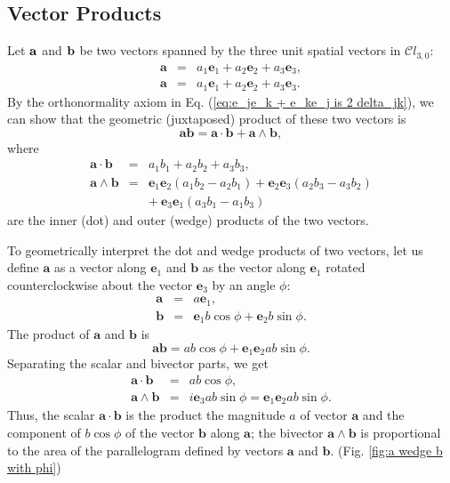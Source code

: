 \documentclass[11pt,twocolumn]{article}
\begin{document}
\subsection{Vector Products}  

Let ${\bf a}$ and ${\bf b}$ be two vectors spanned by the three unit spatial vectors in $\mathcal Cl_{3,0}$:
\begin{eqnarray}
\label{eq:a is a_1e_1 + a_2e_2 + a_3e_3}
\mathbf a&=&a_1\mathbf e_1+a_2\mathbf e_2+a_3\mathbf e_3,\\
\label{eq:b is b_1e_1 + b_2e_2 + b_3e_3}
\mathbf a&=&a_1\mathbf e_1+a_2\mathbf e_2+a_3\mathbf e_3.
\end{eqnarray}
By the orthonormality axiom in Eq. (\ref{eq:e_je_k + e_ke_j is 2 delta_jk}), we can show that the geometric (juxtaposed) product of these two vectors is
\begin{equation}
\label{eq:ab is a dot b + a wedge b}
\mathbf a\mathbf b=\mathbf a\cdot\mathbf b+\mathbf a\wedge\mathbf b,
\end{equation}
where
\begin{eqnarray}
\label{eq:a dot b}
\mathbf a\cdot\mathbf b&=&a_1b_1+a_2b_2+a_3b_3,\\
\label{eq:a wedge b}
\mathbf a\wedge\mathbf b&=&\mathbf e_1\mathbf e_2(a_1b_2-a_2b_1)+\mathbf e_2\mathbf e_3(a_2b_3-a_3b_2)\nonumber\\
& &+\ \mathbf e_3\mathbf e_1(a_3b_1-a_1b_3)
\end{eqnarray}
are the inner (dot) and outer (wedge) products of the two vectors\cite{Jancewicz_1988_MultivectorsandCliffordAlgebrainElectrodynamics_p8}. 



To geometrically interpret the dot and wedge products of two vectors, let us define $\mathbf a$ as a vector along $\mathbf e_1$ and $\mathbf b$ as the vector along $\mathbf e_1$ rotated counterclockwise about the vector $\mathbf e_3$ by an angle $\phi$:
\begin{eqnarray}
\label{eq:a is ae_1}
\mathbf a&=&a\mathbf e_1,\\
\label{eq:b is e_1 b cos phi  + e_2 b sin phi}
\mathbf b&=&\mathbf e_1b\cos\phi+\mathbf e_2b\sin\phi.
\end{eqnarray}
The product of $\mathbf a$ and $\mathbf b$ is
\begin{equation}
\label{eq:ab is ab cos phi + e_1e_2 ab sin phi}
\mathbf a\mathbf b=ab\cos\phi+\mathbf e_1\mathbf e_2ab\sin\phi.
\end{equation}
Separating the scalar and bivector parts, we get
\begin{eqnarray}
\label{eq:a dot b is ab cos phi}
\mathbf a\cdot\mathbf b&=&ab\cos\phi,\\
\label{eq:a wedge b is ab sin phi e_1e_2}
\mathbf a\wedge\mathbf b&=&i\mathbf e_3ab\sin\phi=\mathbf e_1\mathbf e_2ab\sin\phi. 
\end{eqnarray}
Thus, the scalar $\mathbf a\cdot\mathbf b$ is the product the magnitude $a$ of vector $\mathbf a$ and the component of $b\cos\phi$ of the vector $\mathbf b$ along $\mathbf a$; the bivector $\mathbf a\wedge\mathbf b$ is proportional to the area of the parallelogram defined by vectors $\mathbf a$ and $\mathbf b$. (Fig. \ref{fig:a wedge b with phi})  
\medskip
\end{document}
